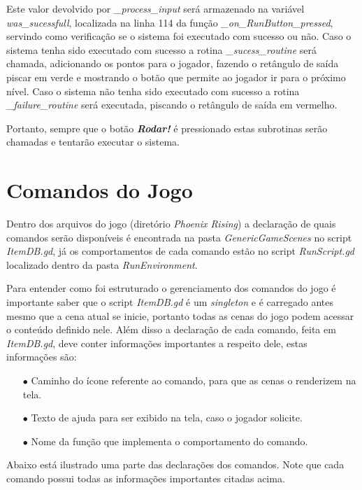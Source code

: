 Este valor devolvido por \textit{\_process\_input} será armazenado na variável 
\textit{was\_sucessfull}, localizada na linha 114 da função 
\textit{\_on\_RunButton\_pressed}, servindo como verificação se o sistema foi 
executado com sucesso ou não. Caso o sistema tenha sido executado com sucesso a
rotina \textit{\_sucess\_routine} será chamada, adicionando os pontos para o
jogador, fazendo o retângulo de saída piscar em verde e mostrando o botão que 
permite ao jogador ir para o próximo nível. Caso o sistema não tenha sido 
executado com sucesso a rotina \textit{\_failure\_routine} será executada,
piscando o retângulo de saída em vermelho.

Portanto, sempre que o botão \textbf{\textit{Rodar!}} é pressionado estas 
subrotinas serão chamadas e tentarão executar o sistema.

\section{Comandos do Jogo}

Dentro dos arquivos do jogo (diretório \textit{Phoenix Rising}) a declaração 
de quais comandos serão disponíveis é encontrada na pasta 
\textit{GenericGameScenes} no script \textit{ItemDB.gd}, já os comportamentos 
de cada comando estão no script \textit{RunScript.gd} localizado dentro da
pasta \textit{RunEnvironment}.

Para entender como foi estruturado o gerenciamento dos comandos do jogo é 
importante saber que o script \textit{ItemDB.gd} é um \textit{singleton} e é 
carregado antes mesmo que a cena atual se inicie, portanto todas as cenas do 
jogo podem acessar o conteúdo definido nele. Além disso a declaração de cada
comando, feita em \textit{ItemDB.gd}, deve conter 
informações importantes a respeito dele, estas informações são:

\begin{itemize}
    \item[$\bullet$]
        Caminho do ícone referente ao comando, para que as cenas o renderizem
        na tela.
    \item[$\bullet$]
        Texto de ajuda para ser exibido na tela, caso o jogador solicite.
    \item[$\bullet$]
        Nome da função que implementa o comportamento do comando.
\end{itemize}

Abaixo está ilustrado uma parte das declarações dos comandos. Note que
cada comando possui todas as informações importantes citadas acima.

